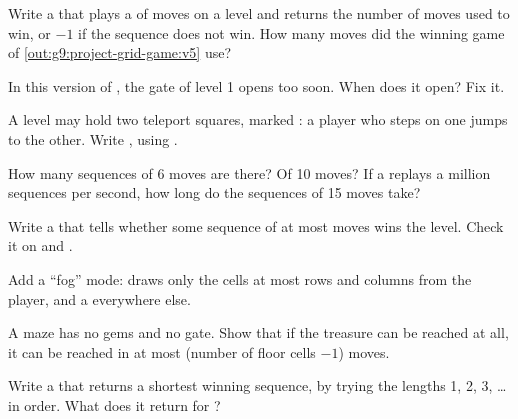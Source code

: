 \begin{exercise}[$\star\star$]\label{exo:g9:project-grid-game:5}
Write a   that plays a  of moves on a
level and returns the number of moves used to win, or $-1$ if the sequence does
not win. How many moves did the winning game of
\cref{out:g9:project-grid-game:v5} use?
\end{exercise}

\begin{exercise}[$\star\star$]\label{exo:g9:project-grid-game:6}
In this version of , the gate of level 1 opens too soon. When does it
open? Fix it.

\label{lst:g9:project-grid-game:gate-bug}
\end{exercise}

\begin{exercise}[$\star\star$]\label{exo:g9:project-grid-game:7}
A level may hold two teleport squares, marked : a player who steps on
one jumps to the other. Write , using
.
\end{exercise}

\begin{exercise}[$\star\star$]\label{exo:g9:project-grid-game:8}
How many sequences of 6 moves are there? Of 10 moves? If a  replays a
million sequences per second, how long do the sequences of 15 moves take?
\end{exercise}

\begin{exercise}[$\star\star$]\label{exo:g9:project-grid-game:9}
Write a   that tells whether some sequence
of at most  moves wins the level. Check it on  and
.
\end{exercise}

\begin{exercise}[$\star\star\star$]\label{exo:g9:project-grid-game:10}
Add a ``fog'' mode:  draws only the cells at most
 rows and  columns from the player, and a 
everywhere else.
\end{exercise}

\begin{exercise}[$\star\star\star$]\label{exo:g9:project-grid-game:11}
A maze has no gems and no gate. Show that if the treasure can be reached at all,
it can be reached in at most (number of floor cells $- 1$) moves.
\end{exercise}

\begin{exercise}[$\star\star\star$]\label{exo:g9:project-grid-game:12}
Write a   that returns a shortest winning
sequence, by trying the lengths 1, 2, 3, \ldots{} in order. What does it return
for ?
\end{exercise}
